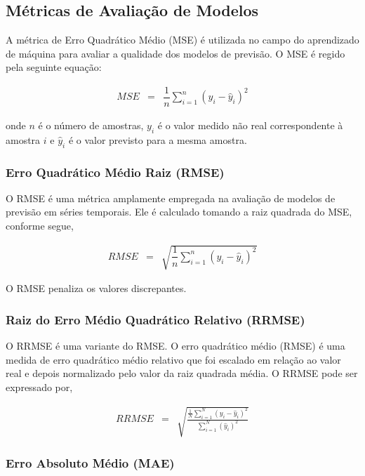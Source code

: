 \subsection{M\'etricas de Avalia\c c\~ao de Modelos}\label{subsec:metrica}

A métrica de Erro Quadrático Médio (MSE) é utilizada no campo do aprendizado de máquina para avaliar a qualidade dos modelos de previsão. O MSE é regido pela seguinte equação:

\begin{eqnarray}
	MSE &=& \dfrac{1}{n} \sum_{i=1}^{n} (y_i - \hat{y}_i)^2 \label{eq:mse}
\end{eqnarray}

\noindent onde $n$ é o número de amostras, $y_i$ é o valor medido não real correspondente à amostra $i$ e $\hat{y}_i$ é o valor previsto para a mesma amostra.

\subsubsection{Erro Quadr\'atico M\'edio Raiz (RMSE)}

O RMSE é uma métrica amplamente empregada na avaliação de modelos de previsão em séries temporais. Ele é calculado tomando a raiz quadrada do MSE, conforme segue,

\begin{eqnarray}
	RMSE &=& \sqrt{\dfrac{1}{n} \sum_{i=1}^{n} (y_i - \hat{y}_i)^2} \label{eq:rmse}
\end{eqnarray}



O RMSE penaliza os valores discrepantes.

\subsubsection{Raiz do Erro M\'edio Quadr\'atico Relativo (RRMSE)}\label{subsub:rrmse}

O RRMSE é uma variante do RMSE. O erro quadrático médio (RMSE) é uma medida de erro quadrático médio relativo que foi escalado em relação ao valor real e depois normalizado pelo valor da raiz quadrada média.  O RRMSE pode ser expressado por,

\begin{eqnarray}
	R R M S E&=&\sqrt{\frac{\frac{1}{N} \sum_{i=1}^N\left(y_i-\hat{y}_i\right)^2}{\sum_{i=1}^N\left(\hat{y}_i\right)^2}}
\end{eqnarray}

\subsubsection{Erro Absoluto M\'edio (MAE)}

